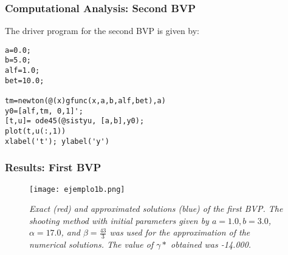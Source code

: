\documentclass{beamer}
\begin{document}
\begin{frame}[fragile]
\frametitle{Computational Analysis: Second BVP} %
The driver program for the second BVP is given by:
\begin{lstlisting}
a=0.0;
b=5.0;
alf=1.0;
bet=10.0;

tm=newton(@(x)gfunc(x,a,b,alf,bet),a)
y0=[alf,tm, 0,1]';
[t,u]= ode45(@sistyu, [a,b],y0);
plot(t,u(:,1))
xlabel('t'); ylabel('y')
\end{lstlisting}
\end{frame}
\begin{frame}
\frametitle{Results: First BVP}
\begin{center}
\begin{figure}
    \texttt{[image: ejemplo1b.png]}
    \caption{\textit{Exact (red) and approximated solutions (blue) of the first BVP. The shooting method with initial parameters given by $a = 1.0, b = 3.0$, $\alpha = 17.0$, and $\beta = \frac{43}{3}$ was used for the approximation of the numerical solutions. The value of $\gamma*$ obtained was -14.000.}}
\end{figure}
\end{center}
\end{frame}
\end{document}
